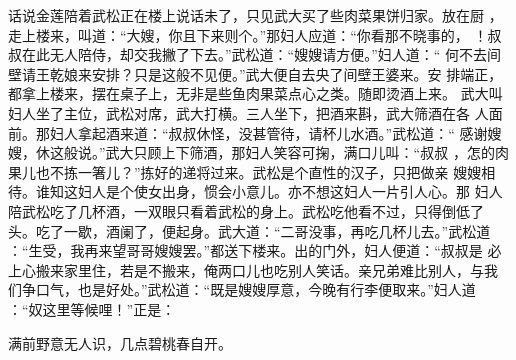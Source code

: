 话说金莲陪着武松正在楼上说话未了，只见武大买了些肉菜果饼归家。放在厨
，走上楼来，叫道：“大嫂，你且下来则个。”那妇人应道：“你看那不晓事的，
！叔叔在此无人陪侍，却交我撇了下去。”武松道：“嫂嫂请方便。”妇人道：“
何不去间壁请王乾娘来安排？只是这般不见便。”武大便自去央了间壁王婆来。安
排端正，都拿上楼来，摆在桌子上，无非是些鱼肉果菜点心之类。随即烫酒上来。
武大叫妇人坐了主位，武松对席，武大打横。三人坐下，把酒来斟，武大筛酒在各
人面前。那妇人拿起酒来道：“叔叔休怪，没甚管待，请杯儿水酒。”武松道：“
感谢嫂嫂，休这般说。”武大只顾上下筛酒，那妇人笑容可掬，满口儿叫：“叔叔
，怎的肉果儿也不拣一箸儿？”拣好的递将过来。武松是个直性的汉子，只把做亲
嫂嫂相待。谁知这妇人是个使女出身，惯会小意儿。亦不想这妇人一片引人心。那
妇人陪武松吃了几杯酒，一双眼只看着武松的身上。武松吃他看不过，只得倒低了
头。吃了一歇，酒阑了，便起身。武大道：“二哥没事，再吃几杯儿去。”武松道
：“生受，我再来望哥哥嫂嫂罢。”都送下楼来。出的门外，妇人便道：“叔叔是
必上心搬来家里住，若是不搬来，俺两口儿也吃别人笑话。亲兄弟难比别人，与我
们争口气，也是好处。”武松道：“既是嫂嫂厚意，今晚有行李便取来。”妇人道
：“奴这里等候哩！”正是：

满前野意无人识，几点碧桃春自开。